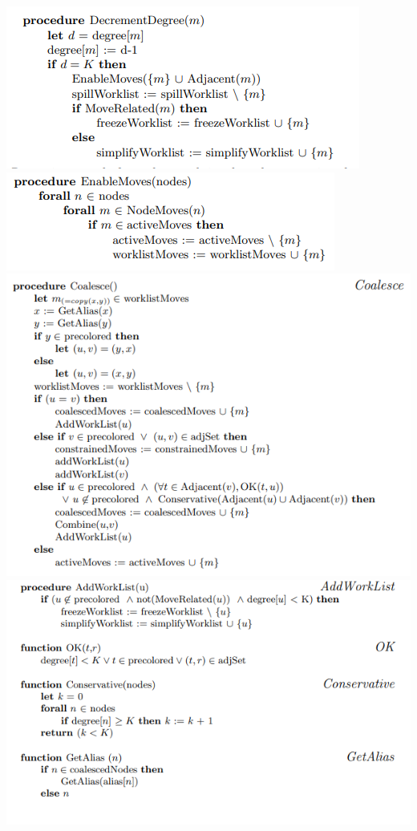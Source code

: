 \begin{center}
    \includegraphics[scale=0.6]{img/code4.png}
    \includegraphics[scale=0.6]{img/code5.png}
    \includegraphics[scale=0.6]{img/code6.png}
    \includegraphics[scale=0.6]{img/code7.png}

\end{center}
